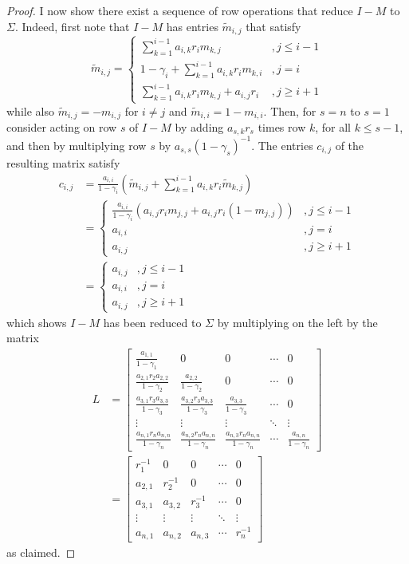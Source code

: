 \documentclass[10pt,a4paper]{amsart}
\begin{document}
\begin{proof}
I now show there exist a sequence of row operations that reduce $I-M$ to $\Sigma$. Indeed, first note that $I-M$ has entries $\tilde{m}_{i,j}$ that satisfy
\[
\tilde{m}_{i,j}=\begin{cases}
\sum_{k=1}^{i-1}a_{i,k}r_im_{k,j} & , j\leq i-1 \\
1-\gamma_i +\sum_{k=1}^{i-1}a_{i,k}r_im_{k,i} &, j=i\\
\sum_{k=1}^{i-1}a_{i,k}r_im_{k,j} + a_{i,j}r_i  &, j\geq i+1
\end{cases}
\]
while also $\tilde{m}_{i,j}=-m_{i,j}$ for $i\neq j$ and $\tilde{m}_{i,i}=1-m_{i,i}$.
Then, for $s=n$ to $s=1$ consider acting on row $s$ of $I-M$ by adding $a_{s,k}r_s$ times row $k$, for all $k\leq s-1$, and then by multiplying row $s$ by $a_{s,s}(1-\gamma_{s})^{-1}$. The entries $c_{i,j}$ of the resulting matrix satisfy
\begin{align*}
c_{i,j}&=\frac{a_{i,i}}{1-\gamma_i}\left( \tilde{m}_{i,j}+\sum_{k=1}^{i-1}a_{i,k}r_i\tilde{m}_{k,j}\right) \\
&=\begin{cases}
\frac{a_{i,i}}{1-\gamma_i}\left( a_{i,j}r_im_{j,j}+a_{i,j}r_i(1-m_{j,j})\right) &, j\leq i-1\\
a_{i,i} &, j=i\\
a_{i,j} &, j\geq i+1
\end{cases} \\
&=
\begin{cases}
a_{i,j}&, j\leq i-1\\
a_{i,i} &, j=i\\
a_{i,j} &, j\geq i+1
\end{cases}
\end{align*}
which shows $I-M$ has been reduced to $\Sigma$ by multiplying on the left by the matrix
\begin{align*}
L&=\begin{bmatrix}
\frac{a_{1,1}}{1-\gamma_1} & 0 & 0 & \cdots & 0\\
\frac{a_{2,1}r_2a_{2,2}}{1-\gamma_2}&  \frac{a_{2,2}}{1-\gamma_2}& 0 & \cdots & 0\\
\frac{a_{3,1}r_3a_{3,3}}{1-\gamma_3}& \frac{a_{3,2}r_3a_{3,3}}{1-\gamma_3} & \frac{a_{3,3}}{1-\gamma_3}& \cdots & 0\\
\vdots & \vdots & \vdots & \ddots & \vdots\\
\frac{a_{n,1}r_na_{n,n}}{1-\gamma_n}& \frac{a_{n,2}r_na_{n,n}}{1-\gamma_n} & \frac{a_{n,3}r_na_{n,n}}{1-\gamma_n} & \cdots & \frac{a_{n,n}}{1-\gamma_n}
\end{bmatrix}\\
&=\begin{bmatrix}
r_1^{-1} & 0 & 0 & \cdots & 0\\
a_{2,1}&  r_2^{-1}& 0 & \cdots & 0\\
a_{3,1}& a_{3,2} & r_3^{-1}& \cdots & 0\\
\vdots & \vdots & \vdots & \ddots & \vdots\\
a_{n,1}& a_{n,2} & a_{n,3} & \cdots & r_n^{-1}
\end{bmatrix}
\end{align*}
as claimed. 
\end{proof}
\end{document}
